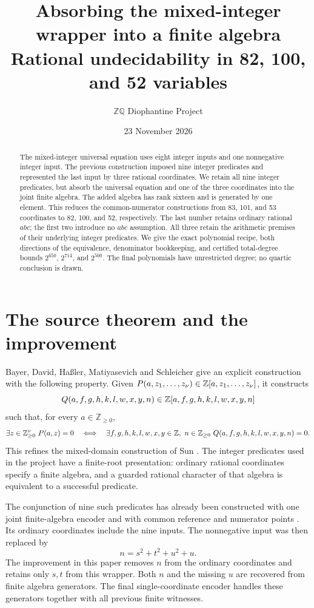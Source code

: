 \documentclass[11pt]{article}
\title{Absorbing the mixed-integer wrapper into a finite algebra\\
Rational undecidability in 82, 100, and 52 variables}
\author{\(\mathbb Z\mathbb Q\) Diophantine Project}
\date{23 November 2026}
\newcommand{\N}{\mathbb Z_{\ge0}}\newcommand{\A}{\mathcal A}
\begin{document}
\maketitle

\begin{abstract}
The mixed-integer universal equation uses eight integer inputs and one
nonnegative integer input.  The previous construction imposed nine
integer predicates and represented the last input by three rational
coordinates.  We retain all nine integer predicates, but absorb the
universal equation and one of the three coordinates into the joint
finite algebra.  The added algebra has rank sixteen and is generated
by one element.  This reduces the common-numerator constructions from
83, 101, and 53 coordinates to 82, 100, and 52, respectively.  The last
number retains ordinary rational \(abc\); the first two introduce no
\(abc\) assumption.  All three retain the arithmetic premises of their
underlying integer predicates.  We give the exact polynomial recipe,
both directions of the equivalence, denominator bookkeeping, and
certified total-degree bounds \(2^{650}\), \(2^{714}\), and \(2^{500}\).
The final polynomials have unrestricted degree; no quartic conclusion
is drawn.
\end{abstract}

\section{The source theorem and the improvement}

Bayer, David, Ha{\ss}ler, Matiyasevich and Schleicher
\cite[Definition 5.3 and Theorem 3]{BDHMS} give an explicit construction
with the following property.  Given
\(P(a,z_1,\ldots,z_\nu)\in\mathbb Z[a,z_1,\ldots,z_\nu]\), it constructs
\[
 Q(a,f,g,h,k,l,w,x,y,n)\in\mathbb Z[a,f,g,h,k,l,w,x,y,n]
\]
such that, for every \(a\in\N\),
\begin{equation}\label{source}
 \exists z\in\N^\nu\ P(a,z)=0
 \quad\Longleftrightarrow\quad
 \exists f,g,h,k,l,w,x,y\in\Z,\ n\in\N\ Q(a,f,g,h,k,l,w,x,y,n)=0.
\end{equation}
This refines the mixed-domain construction of
Sun \cite[Theorem 1.1(i)]{Sun}.  The integer predicates used in the
project have a finite-root presentation: ordinary rational coordinates
specify a finite algebra, and a guarded rational character of that
algebra is equivalent to a successful predicate.

The conjunction of nine such predicates has already been constructed
with one joint finite-algebra encoder and with common reference and
numerator points \cite{Sharing}.  Its ordinary coordinates include the
nine inputs.  The nonnegative input was then replaced by
\[
                 n=s^2+t^2+u^2+u.
\]
The improvement in this paper removes \(n\) from the ordinary coordinates
and retains only \(s,t\) from this wrapper.  Both \(n\) and the missing
\(u\) are recovered from finite algebra generators.  The final
single-coordinate encoder handles these generators together with all
previous finite witnesses.
\end{document}
